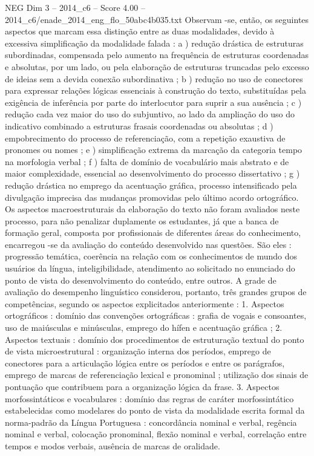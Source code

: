 \begin{textsample}{NEG Dim 3 – 2014\_c6 – Score 4.00 – 2014\_c6/enade\_2014\_eng\_flo\_50abc4b035.txt}
Observam -se, então, os seguintes aspectos que marcam essa distinção entre as duas modalidades, devido à excessiva simplificação da modalidade falada : a ) redução drástica de estruturas subordinadas, compensada pelo aumento na frequência de estruturas coordenadas e absolutas, por um lado, ou pela elaboração de estruturas truncadas pelo excesso de ideias sem a devida conexão subordinativa ; b ) redução no uso de conectores para expressar relações lógicas essenciais à construção do texto, substituídas pela exigência de inferência por parte do interlocutor para suprir a sua ausência ; c ) redução cada vez maior do uso do subjuntivo, ao lado da ampliação do uso do indicativo combinado a estruturas frasais coordenadas ou absolutas ; d ) empobrecimento do processo de referenciação, com a repetição exaustiva de pronomes ou nomes ; e ) simplificação extrema da marcação da categoria tempo na morfologia verbal ; f ) falta de domínio de vocabulário mais abstrato e de maior complexidade, essencial ao desenvolvimento do processo dissertativo ; g ) redução drástica no emprego da acentuação gráfica, processo intensificado pela divulgação imprecisa das mudanças promovidas pelo último acordo ortográfico.
Os aspectos macroestruturais da elaboração do texto não foram avaliados neste processo, para não penalizar duplamente os estudantes, já que a banca de formação geral, composta por profissionais de diferentes áreas do conhecimento, encarregou -se da avaliação do conteúdo desenvolvido nas questões.
São eles : progressão temática, coerência na relação com os conhecimentos de mundo dos usuários da língua, inteligibilidade, atendimento ao solicitado no enunciado do ponto de vista do desenvolvimento do conteúdo, entre outros.
A grade de avaliação do desempenho linguístico considerou, portanto, três grandes grupos de competências, segundo os aspectos explicitados anteriormente : 1.
Aspectos ortográficos : domínio das convenções ortográficas : grafia de vogais e consoantes, uso de maiúsculas e minúsculas, emprego do hífen e acentuação gráfica ; 2.
Aspectos textuais : domínio dos procedimentos de estruturação textual do ponto de vista microestrutural : organização interna dos períodos, emprego de conectores para a articulação lógica entre os períodos e entre os parágrafos, emprego de marcas de referenciação lexical e pronominal ; utilização dos sinais de pontuação que contribuem para a organização lógica da frase. 3.
Aspectos morfossintáticos e vocabulares : domínio das regras de caráter morfossintático estabelecidas como modelares do ponto de vista da modalidade escrita formal da norma-padrão da Língua Portuguesa : concordância nominal e verbal, regência nominal e verbal, colocação pronominal, flexão nominal e verbal, correlação entre tempos e modos verbais, ausência de marcas de oralidade.

\end{textsample}
